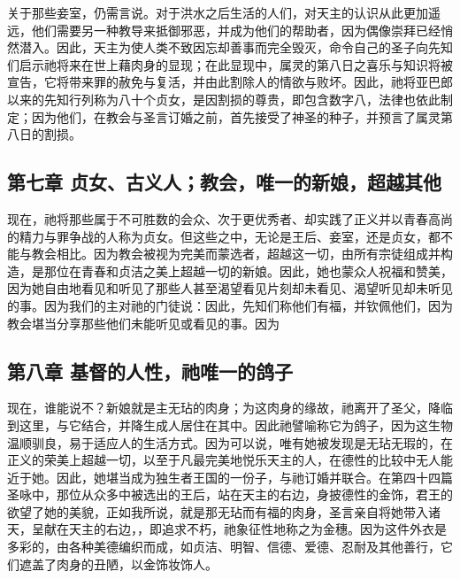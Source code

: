 关于那些妾室，仍需言说。对于洪水之后生活的人们，对天主的认识从此更加遥远，他们需要另一种教导来抵御邪恶，并成为他们的帮助者，因为偶像崇拜已经悄然潜入。因此，天主为使人类不致因忘却善事而完全毁灭，命令自己的圣子向先知们启示祂将来在世上藉肉身的显现；在此显现中，属灵的第八日之喜乐与知识将被宣告，它将带来罪的赦免与复活，并由此割除人的情欲与败坏。因此，祂将亚巴郎以来的先知行列称为八十个贞女，是因割损的尊贵，即包含数字八，法律也依此制定；因为他们，在教会与圣言订婚之前，首先接受了神圣的种子，并预言了属灵第八日的割损。\par


\subsection{第七章 贞女、古义人；教会，唯一的新娘，超越其他}

现在，祂将那些属于不可胜数的会众、次于更优秀者、却实践了正义并以青春高尚的精力与罪争战的人称为贞女。但这些之中，无论是王后、妾室，还是贞女，都不能与教会相比。因为教会被视为完美而蒙选者，超越这一切，由所有宗徒组成并构造，是那位在青春和贞洁之美上超越一切的新娘。因此，她也蒙众人祝福和赞美，因为她自由地看见和听见了那些人甚至渴望看见片刻却未看见、渴望听见却未听见的事。因为我们的主对祂的门徒说：因此，先知们称他们有福，并钦佩他们，因为教会堪当分享那些他们未能听见或看见的事。因为\par


\subsection{第八章 基督的人性，祂唯一的鸽子}

现在，谁能说不？新娘就是主无玷的肉身；为这肉身的缘故，祂离开了圣父，降临到这里，与它结合，并降生成人居住在其中。因此祂譬喻称它为鸽子，因为这生物温顺驯良，易于适应人的生活方式。因为可以说，唯有她被发现是无玷无瑕的，在正义的荣美上超越一切，以至于凡最完美地悦乐天主的人，在德性的比较中无人能近于她。因此，她堪当成为独生者王国的一份子，与祂订婚并联合。在第四十四篇圣咏中，那位从众多中被选出的王后，站在天主的右边，身披德性的金饰，君王的欲望了她的美貌，正如我所说，就是那无玷而有福的肉身，圣言亲自将她带入诸天，呈献在天主的右边，，即追求不朽，祂象征性地称之为金穗。因为这件外衣是多彩的，由各种美德编织而成，如贞洁、明智、信德、爱德、忍耐及其他善行，它们遮盖了肉身的丑陋，以金饰妆饰人。\par

